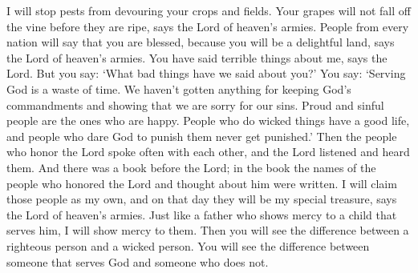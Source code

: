 \bverse \iffalse And I will rebuke the devourer for your sakes, and he shall not destroy the fruits of your ground; neither shall your vine cast her fruit before the time in the fields, saith the Lord of Hosts. \fi
I will stop pests from devouring your crops and fields. Your grapes will not fall off the vine before they are ripe, says the Lord of heaven's armies.
\bverse \iffalse And all nations shall call you blessed, for ye shall be a delightsome land, saith the Lord of Hosts. \fi
People from every nation will say that you are blessed, because you will be a delightful land, says the Lord of heaven's armies.
\bverse \iffalse Your words have been stout against me, saith the Lord. Yet ye say: What have we spoken against thee? \fi
You have said terrible things about me, says the Lord. But you say: \lq What bad things have we said about you?\rq
\bverse \iffalse Ye have said: It is vain to serve God, and what doth it profit that we have kept his ordinances and that we have walked mournfully before the Lord of Hosts? \fi
You say: \lq Serving God is a waste of time. We haven't gotten anything for keeping God's commandments and showing that we are sorry for our sins.
\bverse \iffalse And now we call the proud happy; yea, they that work wickedness are set up; yea, they that tempt God are even delivered. \fi
Proud and sinful people are the ones who are happy. People who do wicked things have a good life, and people who dare God to punish them never get punished.\rq
\bverse \iffalse Then they that feared the Lord spake often one to another, and the Lord hearkened and heard; and a book of remembrance was written before him for them that feared the Lord, and that thought upon his name. \fi
Then the people who honor the Lord spoke often with each other, and the Lord listened and heard them. And there was a book before the Lord; in the book the names of the people who honored the Lord and thought about him were written.
\bverse \iffalse And they shall be mine, saith the Lord of Hosts, in that day when I make up my jewels; and I will spare them as a man spareth his own son that serveth him. \fi
I will claim those people as my own, and on that day they will be my special treasure, says the Lord of heaven's armies. Just like a father who shows mercy to a child that serves him, I will show mercy to them.
\bverse \iffalse Then shall ye return and discern between the righteous and the wicked, between him that serveth God and him that serveth him not. \fi
Then you will see the difference between a righteous person and a wicked person. You will see the difference between someone that serves God and someone who does not.
